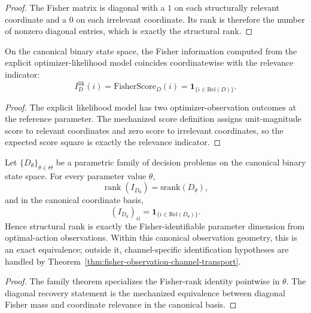 \begin{proof}
The Fisher matrix is diagonal with a $1$ on each structurally relevant coordinate and a $0$ on each irrelevant coordinate. Its rank is therefore the number of nonzero diagonal entries, which is exactly the structural rank.
\end{proof}

\begin{theorem}\label{thm:fisher-likelihood-indicator}
On the canonical binary state space, the Fisher information computed from the explicit optimizer-likelihood model coincides coordinatewise with the relevance indicator:
\[
I^{\mathrm{lik}}_D(i)=\mathrm{FisherScore}_D(i)=\mathbf{1}_{\{i\in \mathrm{Rel}(D)\}}.
\]
\end{theorem}

\begin{proof}
The explicit likelihood model has two optimizer-observation outcomes at the reference parameter. The mechanized score definition assigns unit-magnitude score to relevant coordinates and zero score to irrelevant coordinates, so the expected score square is exactly the relevance indicator.
\end{proof}

\begin{theorem}\label{thm:parametric-fisher-identifiable-dimension}
Let $\{D_\theta\}_{\theta\in\Theta}$ be a parametric family of decision problems on the canonical binary state space. For every parameter value $\theta$,
\[
\operatorname{rank}(I_{D_\theta})=\mathrm{srank}(D_\theta),
\]
and in the canonical coordinate basis,
\[
(I_{D_\theta})_{ii}=\mathbf{1}_{\{i\in \mathrm{Rel}(D_\theta)\}}.
\]
Hence structural rank is exactly the Fisher-identifiable parameter dimension from optimal-action observations.
Within this canonical observation geometry, this is an exact equivalence; outside it, channel-specific
identification hypotheses are handled by Theorem~\ref{thm:fisher-observation-channel-transport}.
\end{theorem}

\begin{proof}
The family theorem specializes the Fisher-rank identity pointwise in $\theta$. The diagonal recovery statement is the mechanized equivalence between diagonal Fisher mass and coordinate relevance in the canonical basis.
\end{proof}

